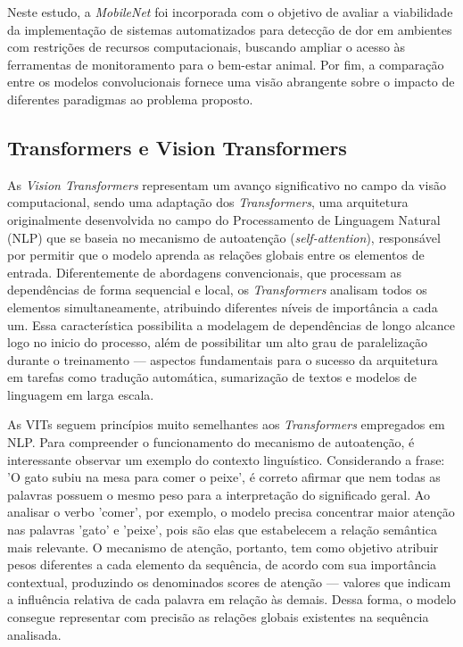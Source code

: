 Neste estudo, a \textit{MobileNet} foi incorporada com o objetivo de avaliar a viabilidade da implementação de sistemas automatizados para detecção de dor em ambientes com restrições de recursos computacionais, buscando ampliar o acesso às ferramentas de monitoramento para o bem-estar animal. Por fim, a comparação entre os modelos convolucionais fornece uma visão abrangente sobre o impacto de diferentes paradigmas ao problema proposto.

\subsection{Transformers e Vision Transformers}

As \textit{Vision Transformers} representam um avanço significativo no campo da visão computacional, sendo uma adaptação dos \textit{Transformers}, uma arquitetura originalmente desenvolvida no campo do Processamento de Linguagem Natural (\acs{NLP}) que se baseia no mecanismo de autoatenção (\textit{self-attention}), responsável por permitir que o modelo aprenda as relações globais entre os elementos de entrada. Diferentemente de abordagens convencionais, que processam as dependências de forma sequencial e local, os \textit{Transformers} analisam todos os elementos simultaneamente, atribuindo diferentes níveis de importância a cada um. Essa característica possibilita a modelagem de dependências de longo alcance logo no inicio do processo, além de possibilitar um alto grau de paralelização durante o treinamento — aspectos fundamentais para o sucesso da arquitetura em tarefas como tradução automática, sumarização de textos e modelos de linguagem em larga escala.

As \acsp{VIT} seguem princípios muito semelhantes aos \textit{Transformers} empregados em \acs{NLP}. Para compreender o funcionamento do mecanismo de autoatenção, é interessante observar um exemplo do contexto linguístico. Considerando a frase: 'O gato subiu na mesa para comer o peixe', é correto afirmar que nem todas as palavras possuem o mesmo peso para a interpretação do significado geral. Ao analisar o verbo 'comer', por exemplo, o modelo precisa concentrar maior atenção nas palavras 'gato' e 'peixe', pois são elas que estabelecem a relação semântica mais relevante. O mecanismo de atenção, portanto, tem como objetivo atribuir pesos diferentes a cada elemento da sequência, de acordo com sua importância contextual, produzindo os denominados scores de atenção — valores que indicam a influência relativa de cada palavra em relação às demais. Dessa forma, o modelo consegue representar com precisão as relações globais existentes na sequência analisada.

